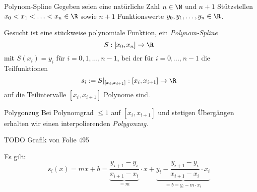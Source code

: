 \begin{defi}{Polynom-Spline}
    Gegeben seien eine natürliche Zahl $n \in \N$ und $n+1$ Stützstellen $x_0 < x_1 < \ldots < x_{n} \in \R$ sowie $n+1$ Funktionswerte $y_0, y_1, \ldots, y_n \in \R$. 
    
    Gesucht ist eine stückweise polynomiale Funktion, ein \emph{Polynom-Spline}
    \[ 
        S: [x_0, x_n] \to \R
    \]
    mit $S(x_i) = y_i$ für $i = 0, 1, \ldots, n-1$, bei der für $i = 0, \ldots, n-1$ die Teilfunktionen 
    \[
        s_i := S|_{[x_{i},x_{i+1}]} : [x_i, x_{i+1}] \to \R
    \]
    auf die Teilintervalle $[x_{i}, x_{i+1}]$ Polynome sind.
\end{defi}

\begin{bonus}{Polygonzug}
    Bei Polynomgrad $\leq 1$ auf $[x_i, x_{i+1}]$ und stetigen Übergängen erhalten wir einen interpolierenden \emph{Polygonzug}.
    
    TODO Grafik von Folie 495
    
    Es gilt: 
    \[ 
        s_i(x) = mx + b = \underbrace{\frac{y_{i+1} - y_i}{x_{i+1} - x_i}}_{= m} \cdot x + \underbrace{y_i - \frac{y_{i+1} - y_i}{x_{i+1} - x_i} \cdot x_i}_{= b = y_i - m \cdot x_i}
    \]
\end{bonus}

